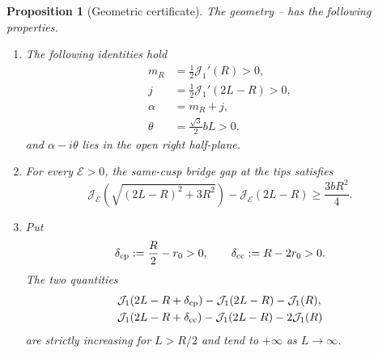 \documentclass[11pt]{article}
\newtheorem{proposition}[theorem]{Proposition}
\newcommand{\cE}{\mathcal E}
\newcommand{\cJ}{\mathcal J}
\begin{document}
\begin{proposition}[Geometric certificate]\label{prop:geometry-certificate}
The geometry -- has the following
properties.
\begin{enumerate}[label=\textup{(\roman*)},leftmargin=2.5em]
\item The {following} identities hold
{\begin{align}
m_R&=\frac12\cJ_1'(R)>0,\label{eq:mR}\\
 j&=\frac12\cJ_1'(2L-R)>0,\label{eq:j-new}\\
 \alpha&=m_R+j,\label{eq:alpha-new}\\
 \theta&=\frac{\sqrt3}{2}bL>0.\label{eq:theta-new}
\end{align}
}and
$\alpha-i\theta$ lies in the open right half-plane.
\item For every $\cE>0$, the same-cusp bridge gap at the tips satisfies
\begin{equation}\label{eq:same-tip-gap}
 \cJ_\cE\!\left(\sqrt{(2L-R)^2+3R^2}\right)-\cJ_\cE(2L-R)
 \ge \frac{3bR^2}{4}.
\end{equation}
\item Put
\[
 \delta_{\rm cp}:=\frac R2-r_0>0,
 \qquad
 \delta_{\rm cc}:=R-2r_0>0.
\]
The two quantities
\begin{align*}
 &\cJ_1(2L-R+\delta_{\rm cp})-\cJ_1(2L-R)-\cJ_1(R),\\
 &\cJ_1(2L-R+\delta_{\rm cc})-\cJ_1(2L-R)-2\cJ_1(R)
\end{align*}
are strictly increasing for $L>R/2$ and tend to $+\infty$ as
$L\to\infty$.
\end{enumerate}
\end{proposition}
\end{document}
